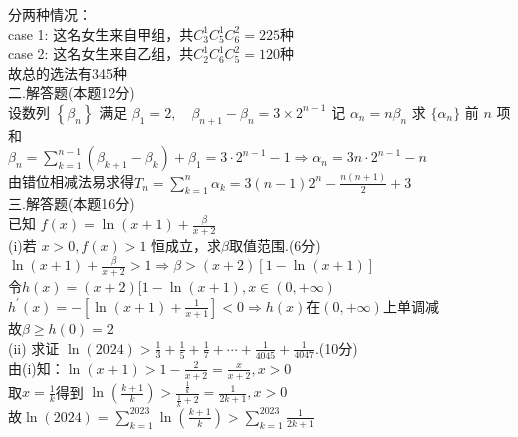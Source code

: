 \documentclass[a4paper,11pt,UTF8]{article}
\begin{document}
分两种情况：\\
case 1: 这名女生来自甲组，共$C_3^1C_5^1C_6^2=225$种\\
case 2: 这名女生来自乙组，共$C_2^1C_6^1C_5^2=120$种\\
故总的选法有345种\\
二.解答题(本题12分)\\
设数列 $\displaystyle\left\{\beta_n\right\}$ 满足 $\displaystyle\beta_1=2 ,\quad \beta_{n+1}-\beta_n=3\times 2^{n-1}$ 记 $\alpha_n=n \beta_n$ 求 $\{\alpha_n\}$ 前 $n$ 项和 \\
$\displaystyle\beta_n=\sum_{k=1}^{n-1}(\beta_{k+1}-\beta_{k})+\beta_1=3\cdot2^{n-1}-1\Rightarrow\alpha_n=3n\cdot2^{n-1}-n$\\
由错位相减法易求得$\displaystyle T_n=\sum_{k=1}^{n}\alpha_k=3(n-1)2^{n}-\frac{n(n+1)}{2}+3$\\
三.解答题(本题16分)\\
已知 $\displaystyle f(x)=\ln (x+1)+\frac{\beta}{x+2}$\\
(i)若 $x>0 , f(x)>1$ 恒成立，求$\beta$取值范围.(6分)\\
$\displaystyle \ln (x+1)+\frac{\beta}{x+2}>1\Rightarrow \beta>(x+2)[1-\ln(x+1)]$\\ 
令$h(x)=(x+2)[1-\ln(x+1), x\in(0,+\infty)$\\
$\displaystyle h^{\prime}(x)=-[\ln(x+1)+\frac{1}{x+1}]<0\Rightarrow h(x)$在$(0,+\infty)$上单调减\\
故$\beta\geq h(0)=2$\\
(ii) 求证 $\displaystyle\ln (2024)>\frac{1}{3}+\frac{1}{5}+\frac{1}{7}+\cdots+\frac{1}{4045}+\frac{1}{4047}$.(10分)\\
由(i)知：$\displaystyle\ln(x+1)>1-\frac{2}{x+2}=\frac{x}{x+2},x>0$\\
取$\displaystyle x=\frac{1}{k}$得到 $\displaystyle\ln(\frac{k+1}{k})>\frac{\frac{1}{k}}{\frac{1}{k}+2}=\frac{1}{2k+1},x>0$\\
故$\displaystyle\ln(2024)=\sum_{k=1}^{2023}\ln(\frac{k+1}{k})>\sum_{k=1}^{2023}\frac{1}{2k+1}$\\
\end{document}
